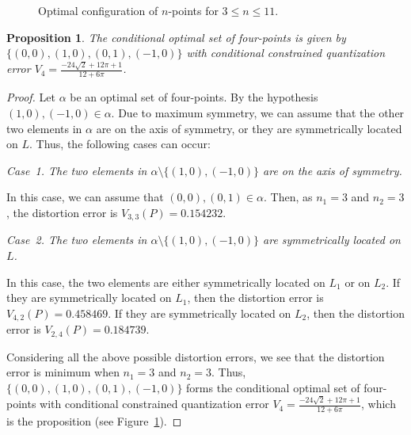 \documentclass[12pt, reqno]{amsart}
\theoremstyle{plain}
\newtheorem{prop}[subsection]{Proposition}
\theoremstyle{definition}
\newcommand{\set}[1]{\{#1\}}%
\newcommand{\ga}{\alpha}
\newcommand{\tit}{\textit}%
\begin{document}
\begin{figure}
 \caption{Optimal configuration of $n$-points for $3\leq n\leq 11$.} \label{Fig1}
\end{figure}


\begin{prop}\label{Me300} 
 The conditional optimal set of four-points is given by $\set{(0, 0), (1, 0), (0, 1), (-1, 0)}$ with conditional constrained quantization error $V_4=\frac{-24 \sqrt{2}+12 \pi +1}{12+6 \pi }$. 
 \end{prop} 
\begin{proof}
Let $\ga$ be an optimal set of four-points. By the hypothesis $(1, 0), (-1 ,0)\in \ga$. Due to maximum symmetry, we can assume that the other two elements in $\ga$ are on the axis of symmetry, or they are symmetrically located on $L$. Thus, the following cases can occur: 

\tit{Case~1. The two elements in $\ga\setminus \set {(1, 0), (-1, 0)}$ are on the axis of symmetry.}

In this case, we can assume that $(0, 0) , (0, 1)\in \ga$. Then, as $n_1=3$ and $n_2=3$, the distortion error is $V_{3,3}(P)=0.154232.$
 

\tit{Case~2. The two elements in $\ga\setminus \set {(1, 0), (-1, 0)}$ are symmetrically located on $L$.} 

In this case, the two elements are either symmetrically located on $L_1$ or on $L_2$. If they are symmetrically located on $L_1$, then 
the distortion error is $V_{4, 2}(P)=0.458469$.  If they are symmetrically located on $L_2$, then the distortion error is $V_{2, 4}(P)=0.184739.$
 

Considering all the above possible distortion errors, we see that the distortion error is minimum when $n_1=3$ and $n_2=3$. Thus, $\set{(0, 0), (1, 0), (0, 1), (-1, 0)}$ forms the conditional optimal set of four-points with conditional constrained quantization error $V_4=\frac{-24 \sqrt{2}+12 \pi +1}{12+6 \pi }$, which is the proposition (see Figure~\ref{Fig1}). 
\end{proof}
 
\end{document}
